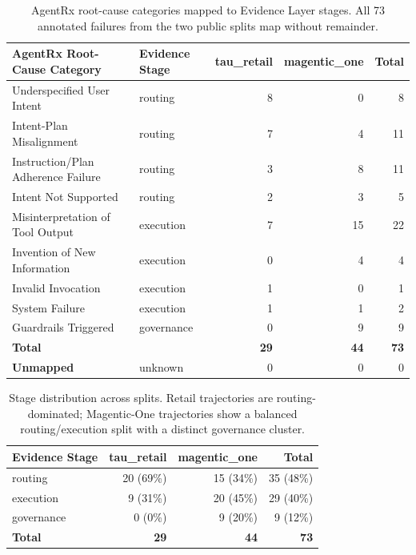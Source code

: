 \documentclass[11pt]{article}
\begin{document}
\begin{table}[t!]
  \centering
  \small
  \begin{tabular}{p{5.8cm}lrrr}
    \toprule
    \textbf{AgentRx Root-Cause Category} & \textbf{Evidence Stage} & \textbf{tau\_retail} & \textbf{magentic\_one} & \textbf{Total} \\
    \midrule
    Underspecified User Intent       & routing    & 8  & 0  & 8  \\
    Intent-Plan Misalignment         & routing    & 7  & 4  & 11 \\
    Instruction/Plan Adherence Failure & routing  & 3  & 8  & 11 \\
    Intent Not Supported             & routing    & 2  & 3  & 5  \\
    \midrule
    Misinterpretation of Tool Output & execution  & 7  & 15 & 22 \\
    Invention of New Information     & execution  & 0  & 4  & 4  \\
    Invalid Invocation               & execution  & 1  & 0  & 1  \\
    System Failure                   & execution  & 1  & 1  & 2  \\
    \midrule
    Guardrails Triggered             & governance & 0  & 9  & 9  \\
    \midrule
    \textbf{Total}                   &            & \textbf{29} & \textbf{44} & \textbf{73} \\
    \textbf{Unmapped}                & unknown    & 0  & 0  & 0  \\
    \bottomrule
  \end{tabular}
  \caption{AgentRx root-cause categories mapped to Evidence Layer stages. All 73 annotated failures from the two public splits map without remainder.}
  \label{tab:agentrx-mapping}
\end{table}

\begin{table}[t!]
  \centering
  \begin{tabular}{lrrr}
    \toprule
    \textbf{Evidence Stage} & \textbf{tau\_retail} & \textbf{magentic\_one} & \textbf{Total} \\
    \midrule
    routing    & 20 (69\%) & 15 (34\%) & 35 (48\%) \\
    execution  &  9 (31\%) & 20 (45\%) & 29 (40\%) \\
    governance &  0 (0\%)  &  9 (20\%) &  9 (12\%) \\
    \midrule
    \textbf{Total} & \textbf{29} & \textbf{44} & \textbf{73} \\
    \bottomrule
  \end{tabular}
  \caption{Stage distribution across splits. Retail trajectories are routing-dominated; Magentic-One trajectories show a balanced routing/execution split with a distinct governance cluster.}
  \label{tab:split-stats}
\end{table}
\end{document}
